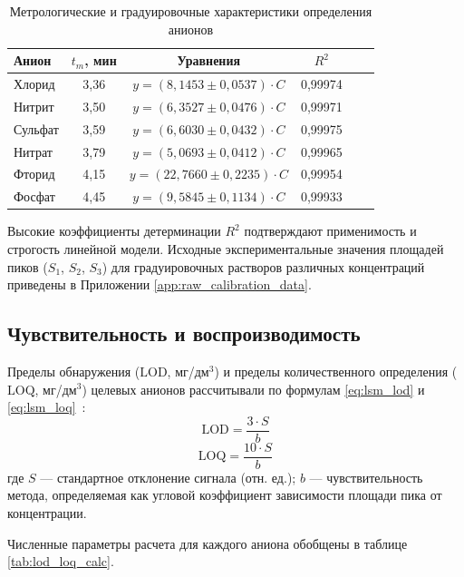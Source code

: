 \begin{table}[H]
\centering
\caption{Метрологические и градуировочные характеристики определения анионов}
\label{tab:metro_params}
\begin{tabular}{|l|c|c|c|c|c|}
\hline
Анион & $t_m$, мин & Уравнения & $R^2$ \\ \hline
Хлорид   & 3,36 & $y = (8,1453 \pm 0,0537) \cdot C$ & 0,99974 \\ \hline
Нитрит   & 3,50 & $y = (6,3527 \pm 0,0476) \cdot C$ & 0,99971 \\ \hline
Сульфат  & 3,59 & $y = (6,6030 \pm 0,0432) \cdot C$ & 0,99975 \\ \hline
Нитрат   & 3,79 & $y = (5,0693 \pm 0,0412) \cdot C$ & 0,99965 \\ \hline
Фторид   & 4,15 & $y = (22,7660 \pm 0,2235) \cdot C$ & 0,99954 \\ \hline
Фосфат   & 4,45 & $y = (9,5845 \pm 0,1134) \cdot C$ & 0,99933 \\ \hline
\end{tabular}
\end{table}

Высокие коэффициенты детерминации $R^2$ подтверждают применимость и строгость линейной модели. Исходные экспериментальные значения площадей пиков ($S_1$, $S_2$, $S_3$) для градуировочных растворов различных концентраций приведены в Приложении \ref{app:raw_calibration_data}.


\subsection{Чувствительность и воспроизводимость}

Пределы обнаружения ($\text{LOD}$, мг/дм$^3$) и пределы количественного определения ($\text{LOQ}$, мг/дм$^3$) целевых анионов рассчитывали по формулам \eqref{eq:lsm_lod} и \eqref{eq:lsm_loq}~\cite{filiposkaSpasicValidationIon2025}:
\begin{equation} \label{eq:lsm_lod}
	\text{LOD} = \frac{3 \cdot S}{b}
\end{equation}
\begin{equation} \label{eq:lsm_loq}
	\text{LOQ} = \frac{10 \cdot S}{b}
\end{equation}
где $S$ — стандартное отклонение сигнала (отн. ед.); $b$ — чувствительность метода, определяемая как угловой коэффициент зависимости площади пика от концентрации.

Численные параметры расчета для каждого аниона обобщены в таблице \ref{tab:lod_loq_calc}.

